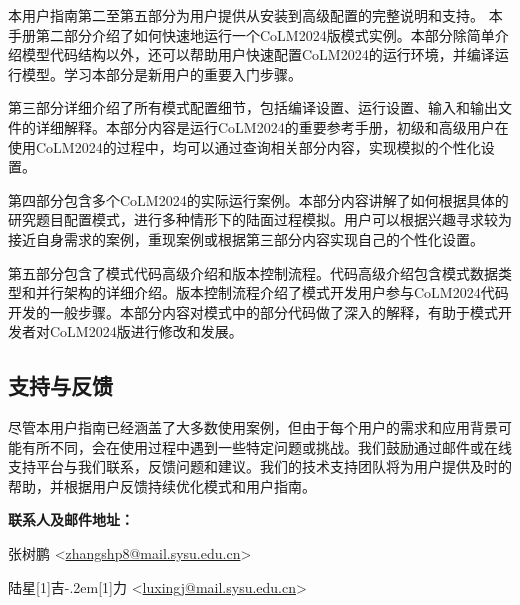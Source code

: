 本用户指南第二至第五部分为用户提供从安装到高级配置的完整说明和支持。
本手册第二部分介绍了如何快速地运行一个CoLM2024版模式实例。本部分除简单介绍模型代码结构以外，还可以帮助用户快速配置CoLM2024的运行环境，并编译运行模型。学习本部分是新用户的重要入门步骤。

第三部分详细介绍了所有模式配置细节，包括编译设置、运行设置、输入和输出文件的详细解释。本部分内容是运行CoLM2024的重要参考手册，初级和高级用户在使用CoLM2024的过程中，均可以通过查询相关部分内容，实现模拟的个性化设置。

第四部分包含多个CoLM2024的实际运行案例。本部分内容讲解了如何根据具体的研究题目配置模式，进行多种情形下的陆面过程模拟。用户可以根据兴趣寻求较为接近自身需求的案例，重现案例或根据第三部分内容实现自己的个性化设置。

第五部分包含了模式代码高级介绍和版本控制流程。代码高级介绍包含模式数据类型和并行架构的详细介绍。版本控制流程介绍了模式开发用户参与CoLM2024代码开发的一般步骤。本部分内容对模式中的部分代码做了深入的解释，有助于模式开发者对CoLM2024版进行修改和发展。

\subsection{支持与反馈}

尽管本用户指南已经涵盖了大多数使用案例，但由于每个用户的需求和应用背景可能有所不同，会在使用过程中遇到一些特定问题或挑战。我们鼓励通过邮件或在线支持平台与我们联系，反馈问题和建议。我们的技术支持团队将为用户提供及时的帮助，并根据用户反馈持续优化模式和用户指南。

\textbf{联系人及邮件地址：}

张树鹏 <\url{zhangshp8@mail.sysu.edu.cn}>

陆星\hbox{\scalebox{0.6}[1]{吉}\kern-.2em\scalebox{0.6}[1]{力}} <\url{luxingj@mail.sysu.edu.cn}>
